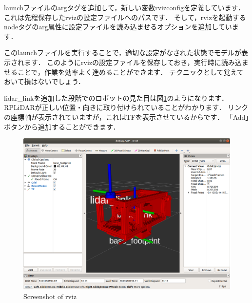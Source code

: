 \documentclass[{../../master}]{subfiles}
\begin{document}
launchファイルの\textsf{arg}タグを追加して，新しい変数\textsf{rvizconfig}を定義しています．
これは先程保存した\textsf{rviz}の設定ファイルへのパスです．
そして，\textsf{rviz}を起動する\textsf{node}タグの\textsf{arg}属性に設定ファイルを読み込ませるオプションを追加しています．

このlaunchファイルを実行することで，適切な設定がなされた状態でモデルが表示されます．
このように\textsf{rviz}の設定ファイルを保存しておき，実行時に読み込ませることで，作業を効率よく進めることができます．
テクニックとして覚えておいて損はないでしょう．

\textsf{lidar\_link}を追加した段階でのロボットの見た目は図\ref{fig:lidar_link_visualization}のようになります．
RPLiDARが正しい位置・向きに取り付けられていることがわかります．
リンクの座標軸が表示されていますが，これは\textsf{TF}を表示させているからです．
「Add」ボタンから追加することができます．

\begin{figure}[ht]
  \centering
  \includegraphics[height=50truemm]{images/lidar_link_visualization.png}
  \caption{Screenshot of \textsf{rviz}}
  \label{fig:lidar_link_visualization}
\end{figure}
\end{document}
